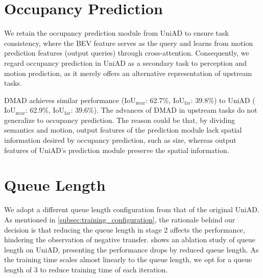 \section{Occupancy Prediction}
\label{app:occupancy}
We retain the occupancy prediction module from UniAD to ensure task consistency, where the \gls{BEV} feature serves as the query and learns from motion prediction features (output queries) through cross-attention. Consequently, we regard occupancy prediction in UniAD as a secondary task to perception and motion prediction, as it merely offers an alternative representation of upstream tasks.

DMAD achieves similar performance ($\text{IoU}_\text{near}$: 62.7\%, $\text{IoU}_\text{far}$: 39.8\%) to UniAD ($\text{IoU}_\text{near}$: 62.9\%, $\text{IoU}_\text{far}$: 39.6\%). The advances of DMAD in upstream tasks do not generalize to occupancy prediction. The reason could be that, by dividing semantics and motion, output features of the prediction module lack spatial information desired by occupancy prediction, such as size, whereas output features of UniAD's prediction module preserve the spatial information.






\section{Queue Length}
\label{app:queue}
We adopt a different queue length configuration from that of the original UniAD. As mentioned in \cref{subsec:training_configuration}, the rationale behind our decision is that reducing the queue length in stage 2 affects the performance, hindering the observation of negative transfer.  shows an ablation study of queue length on UniAD, presenting the performance drops by reduced queue length. 
As the training time scales almost linearly to the queue length, we opt for a queue length of 3 to reduce training time of each iteration.

